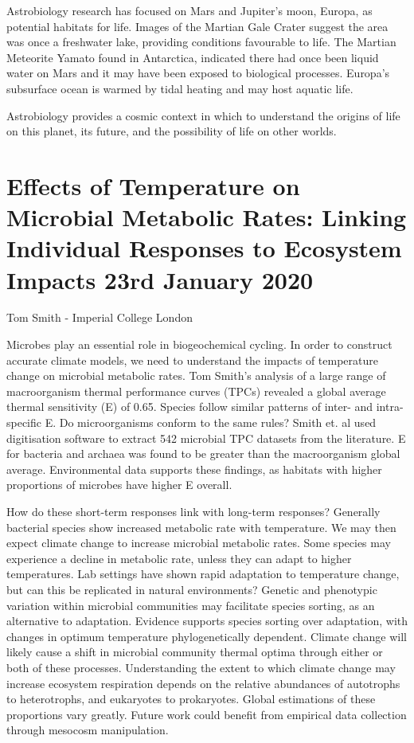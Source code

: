 \documentclass{article}
\begin{document}
\noindent Astrobiology research has focused on Mars and Jupiter’s moon, Europa, as potential habitats for life. Images of the Martian Gale Crater suggest the area was once a freshwater lake, providing conditions favourable to life. The Martian Meteorite Yamato found in Antarctica, indicated there had once been liquid water on Mars and it may have been exposed to biological processes. Europa’s subsurface ocean is warmed by tidal heating and may host aquatic life. \bigskip

\noindent Astrobiology provides a cosmic context in which to understand the origins of life on this planet, its future, and the possibility of life on other worlds.  

\section{Effects of Temperature on Microbial Metabolic Rates: Linking Individual Responses to Ecosystem Impacts 23rd January 2020}

Tom Smith - Imperial College London \bigskip

\noindent Microbes play an essential role in biogeochemical cycling. In order to construct accurate climate models, we need to understand the impacts of temperature change on microbial metabolic rates. Tom Smith's analysis of a large range of macroorganism thermal performance curves (TPCs) revealed a global average thermal sensitivity (E) of 0.65. Species follow similar patterns of inter- and intra- specific E. Do microorganisms conform to the same rules? Smith et. al used digitisation software to extract 542 microbial TPC datasets from the literature. E for bacteria and archaea was found to be greater than the macroorganism global average. Environmental data supports these findings, as habitats with higher proportions of microbes have higher E overall. \bigskip   

\noindent How do these short-term responses link with long-term responses? Generally bacterial species show increased metabolic rate with temperature. We may then expect climate change to increase microbial metabolic rates. Some species may experience a decline in metabolic rate, unless they can adapt to higher temperatures. Lab settings have shown rapid adaptation to temperature change, but can this be replicated in natural environments? Genetic and phenotypic variation within microbial communities may facilitate species sorting, as an alternative to adaptation. Evidence supports species sorting over adaptation, with changes in optimum temperature phylogenetically dependent. Climate change will likely cause a shift in microbial community thermal optima through either or both of these processes. Understanding the extent to which climate change may increase ecosystem respiration depends on the relative abundances of autotrophs to heterotrophs, and eukaryotes to prokaryotes. Global estimations of these proportions vary greatly. Future work could benefit from empirical data collection through mesocosm manipulation.      
\end{document}
